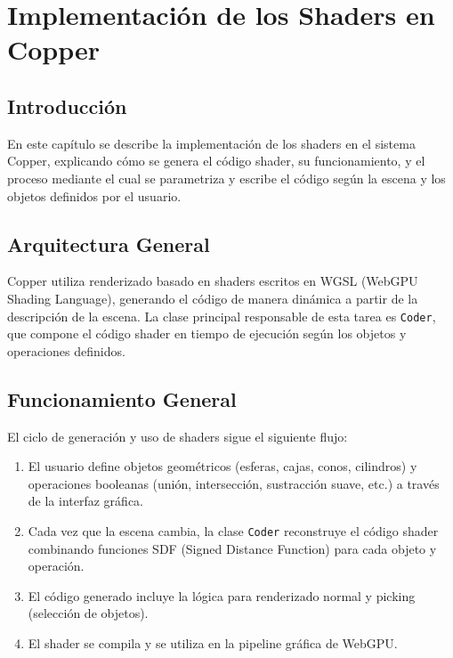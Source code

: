 \chapter{Implementación de los Shaders en Copper}

\section{Introducción}

En este capítulo se describe la implementación de los shaders en el sistema
Copper, explicando cómo se genera el código shader, su funcionamiento, y el
proceso mediante el cual se parametriza y escribe el código según la escena y
los objetos definidos por el usuario.

\section{Arquitectura General}

Copper utiliza renderizado basado en shaders escritos en WGSL (WebGPU Shading
Language), generando el código de manera dinámica a partir de la descripción de
la escena. La clase principal responsable de esta tarea es \texttt{Coder}, que
compone el código shader en tiempo de ejecución según los objetos y operaciones
definidos.

\section{Funcionamiento General}

El ciclo de generación y uso de shaders sigue el siguiente flujo:

\begin{enumerate}
    \item El usuario define objetos geométricos (esferas, cajas, conos, cilindros) y
          operaciones booleanas (unión, intersección, sustracción suave, etc.) a través
          de la interfaz gráfica.
    \item Cada vez que la escena cambia, la clase \texttt{Coder} reconstruye el código
          shader combinando funciones SDF (Signed Distance Function) para cada objeto y
          operación.
    \item El código generado incluye la lógica para renderizado normal y picking
          (selección de objetos).
    \item El shader se compila y se utiliza en la pipeline gráfica de WebGPU.
\end{enumerate}

